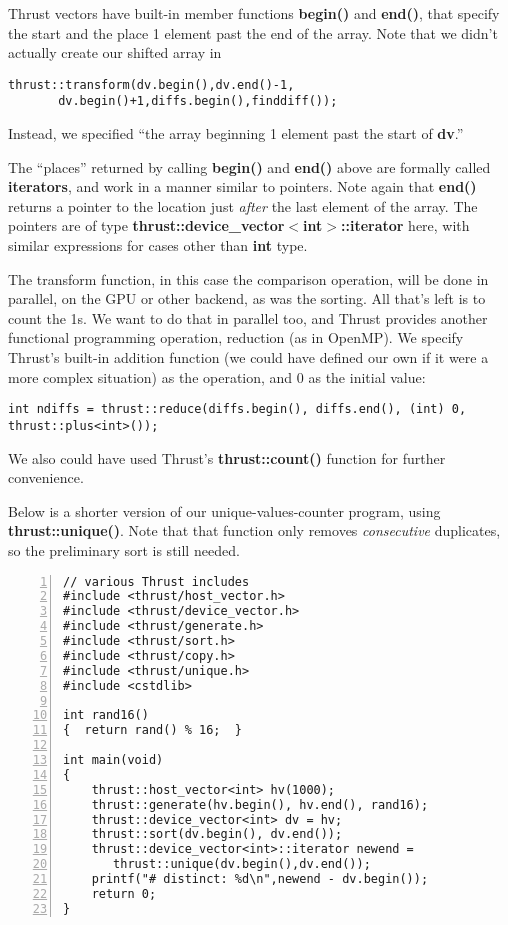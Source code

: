 Thrust vectors have built-in member functions {\bf begin()} and {\bf
end()}, that specify the start and the place 1 element past the end of
the array.  Note that we didn't actually create our shifted array in

\begin{lstlisting}
thrust::transform(dv.begin(),dv.end()-1,
       dv.begin()+1,diffs.begin(),finddiff());
\end{lstlisting}

Instead, we specified ``the array beginning 1 element past the start of
{\bf dv}.''

The ``places'' returned by calling {\bf begin()} and {\bf end()} above
are formally called {\bf iterators}, and work in a manner similar to
pointers.  Note again that {\bf end()} returns a pointer to the location
just {\it after} the last element of the array.  The pointers are of
type \textbf{thrust::device\_vector$<$int$>$::iterator} here, with
similar expressions for cases other than {\bf int} type.

The transform function, in this case the comparison operation, will be
done in parallel, on the GPU or other backend, as was the sorting.
All that's left is to count the 1s.  We want to do that in parallel too,
and Thrust provides another functional programming operation, reduction
(as in OpenMP).  We specify Thrust's built-in addition function (we
could have defined our own if it were a more complex situation) as the
operation, and 0 as the initial value:  

\begin{lstlisting}
int ndiffs = thrust::reduce(diffs.begin(), diffs.end(), (int) 0, thrust::plus<int>());
\end{lstlisting}

We also could have used Thrust's {\bf thrust::count()} function for
further convenience.

Below is a shorter version of our unique-values-counter program, using
{\bf thrust::unique()}.  Note that that function only removes {\it
consecutive} duplicates, so the preliminary sort is still needed.

\begin{lstlisting}[numbers=left]
// various Thrust includes
#include <thrust/host_vector.h>
#include <thrust/device_vector.h>
#include <thrust/generate.h>
#include <thrust/sort.h>
#include <thrust/copy.h>
#include <thrust/unique.h>
#include <cstdlib>

int rand16()  
{  return rand() % 16;  }

int main(void)
{
    thrust::host_vector<int> hv(1000);
    thrust::generate(hv.begin(), hv.end(), rand16);
    thrust::device_vector<int> dv = hv;
    thrust::sort(dv.begin(), dv.end());
    thrust::device_vector<int>::iterator newend = 
       thrust::unique(dv.begin(),dv.end());
    printf("# distinct: %d\n",newend - dv.begin());
    return 0;
}
\end{lstlisting}

